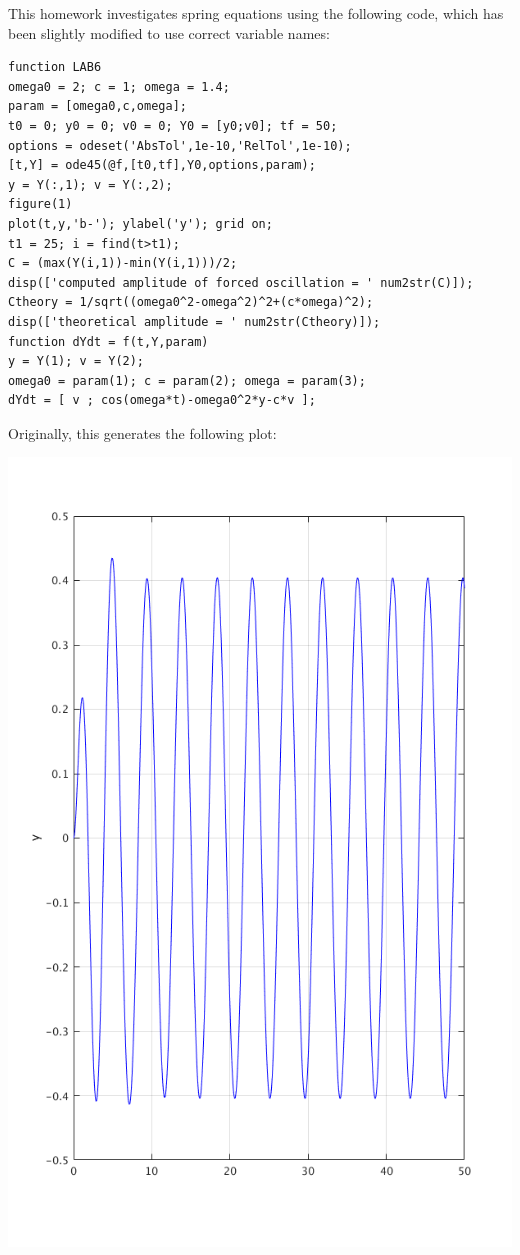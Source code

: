 
This homework investigates spring equations using the following code, which has been slightly modified to use correct variable names:

\begin{verbatim}
function LAB6
omega0 = 2; c = 1; omega = 1.4;
param = [omega0,c,omega];
t0 = 0; y0 = 0; v0 = 0; Y0 = [y0;v0]; tf = 50;
options = odeset('AbsTol',1e-10,'RelTol',1e-10);
[t,Y] = ode45(@f,[t0,tf],Y0,options,param);
y = Y(:,1); v = Y(:,2);
figure(1)
plot(t,y,'b-'); ylabel('y'); grid on;
t1 = 25; i = find(t>t1);
C = (max(Y(i,1))-min(Y(i,1)))/2;
disp(['computed amplitude of forced oscillation = ' num2str(C)]);
Ctheory = 1/sqrt((omega0^2-omega^2)^2+(c*omega)^2);
disp(['theoretical amplitude = ' num2str(Ctheory)]);
function dYdt = f(t,Y,param)
y = Y(1); v = Y(2);
omega0 = param(1); c = param(2); omega = param(3);
dYdt = [ v ; cos(omega*t)-omega0^2*y-c*v ];
\end{verbatim}

Originally, this generates the following plot:

\includegraphics[scale=0.4]{0.png}

